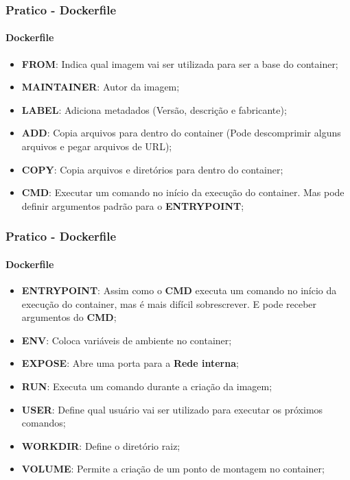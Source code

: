 \begin{frame}
	\frametitle{Pratico - Dockerfile}
	\framesubtitle{Dockerfile}
	\begin{itemize}
		\item \textbf{FROM}: Indica qual imagem vai ser utilizada para ser a base do container;
		\item \textbf{MAINTAINER}: Autor da imagem;
		\item \textbf{LABEL}: Adiciona metadados (Versão, descrição e fabricante);
		\item \textbf{ADD}: Copia arquivos para dentro do container (Pode descomprimir alguns arquivos e pegar arquivos de URL);
		\item \textbf{COPY}: Copia arquivos e diretórios para dentro do container;
		\item \textbf{CMD}: Executar um comando no início da execução do container. Mas pode definir argumentos padrão para o \textbf{ENTRYPOINT};
	\end{itemize}
\end{frame}

\begin{frame}[t]
	\frametitle{Pratico - Dockerfile}
	\framesubtitle{Dockerfile}
	\begin{itemize}
		\item \textbf{ENTRYPOINT}: Assim como o \textbf{CMD} executa um comando no início da execução do container, mas é mais difícil sobrescrever. E pode receber argumentos do \textbf{CMD};
		\item \textbf{ENV}: Coloca variáveis de ambiente no container;
		\item \textbf{EXPOSE}: Abre uma porta para a \textbf{Rede interna};
		\item \textbf{RUN}: Executa um comando durante a criação da imagem;
		\item \textbf{USER}: Define qual usuário vai ser utilizado para executar os próximos comandos;
		\item \textbf{WORKDIR}: Define o diretório raiz;
		\item \textbf{VOLUME}: Permite a criação de um ponto de montagem no container;
	\end{itemize}
\end{frame}
